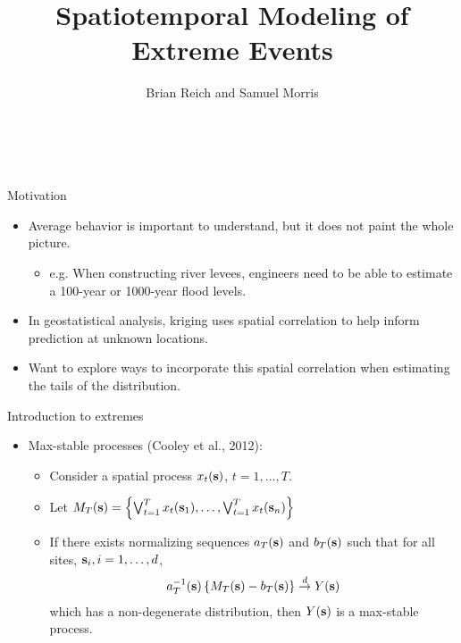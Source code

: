 \documentclass{beamer}
\title[Spatiotemporal Modeling of Extreme Events] %
{
  Spatiotemporal Modeling of Extreme Events
}
\author[B. Reich and S. Morris]{Brian Reich and Samuel Morris}
\institute[NCSU]{North Carolina State University}
\date{}
\begin{document}
\begin{frame}\frametitle{\ }
\begin{center}
	\maketitle
\end{center}
\end{frame}

\begin{frame}{Motivation}
  \begin{itemize} \setlength{\itemsep}{1em}
    \item Average behavior is important to understand, but it does not paint the whole picture.
    \begin{itemize}
      \item e.g. When constructing river levees, engineers need to be able to estimate a 100-year or 1000-year flood levels.
    \end{itemize}
    \item In geostatistical analysis, kriging uses spatial correlation to help inform prediction at unknown locations.
    \item Want to explore ways to incorporate this spatial correlation when estimating the tails of the distribution.
  \end{itemize}
\end{frame}

\begin{frame}{Introduction to extremes}
  \begin{itemize} \setlength{\itemsep}{0.5em}
    \item Max-stable processes (Cooley et al., 2012):
    \begin{itemize}
      \item Consider a spatial process $x_t(\mbox{\bf s})$, $t = 1, \ldots, T$.
      \item Let $M_T(\mbox{\bf s}) = \left\{ \bigvee_{t=1}^T x_t(\mbox{\bf s}_1), \ldots, \bigvee_{t=1}^T x_t(\mbox{\bf s}_n) \right\}$
      \item If there exists normalizing sequences $a_T(\mbox{\bf s})$ and $b_T(\mbox{\bf s})$ such
      that for all sites, $\mbox{\bf s}_i, i = 1, \ldots, d$,
      \begin{align*}
        a_T^{-1}(\mbox{\bf s}) \left\{ M_T(\mbox{\bf s}) - b_T(\mbox{\bf s}) \right\} \stackrel{d}{\rightarrow} Y(\mbox{\bf s})
      \end{align*}
      which has a non-degenerate distribution, then $Y(\mbox{\bf s})$ is a max-stable process.
    \end{itemize}
  \end{itemize}
\end{frame}
\end{document}
